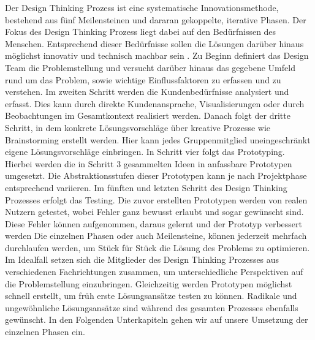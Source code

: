 Der Design Thinking Prozess ist eine systematische Innovationsmethode, bestehend aus fünf Meilensteinen und dararan gekoppelte, iterative Phasen. Der Fokus des Design Thinking Prozess liegt dabei auf den Bedürfnissen des Menschen. Entsprechend dieser Bedürfnisse sollen die Lösungen darüber hinaus möglichst innovativ und technisch machbar sein .
Zu Beginn definiert das Design Team die Problemstellung und versucht darüber hinaus das gegebene Umfeld rund um das Problem, sowie wichtige Einflussfaktoren zu erfassen und zu verstehen.
Im zweiten Schritt werden die Kundenbedürfnisse analysiert und erfasst. Dies kann durch direkte Kundenansprache, Visualisierungen oder durch Beobachtungen im Gesamtkontext realisiert werden.
Danach folgt der dritte Schritt, in dem konkrete Lösungsvorschläge über kreative Prozesse wie Brainstorming erstellt werden. Hier kann jedes Gruppenmitglied uneingeschränkt eigene Lösungsvorschläge einbringen.
In Schritt vier folgt das Prototyping. Hierbei werden die in Schritt 3 gesammelten Ideen in anfassbare Prototypen umgesetzt. Die Abstraktionsstufen dieser Prototypen kann je nach Projektphase entsprechend variieren.
Im fünften und letzten Schritt des Design Thinking Prozesses erfolgt das Testing. Die zuvor erstellten Prototypen werden von realen Nutzern getestet, wobei Fehler ganz bewusst erlaubt und sogar gewünscht sind. Diese Fehler können aufgenommen, daraus gelernt und der Prototyp verbessert werden  
Die einzelnen Phasen oder auch Meilensteine, können jederzeit mehrfach durchlaufen werden, um Stück für Stück die Lösung des Problems zu optimieren. Im Idealfall setzen sich die Mitglieder des Design Thinking Prozesses aus verschiedenen Fachrichtungen zusammen, um unterschiedliche Perspektiven auf die Problemstellung einzubringen. Gleichzeitig werden Prototypen möglichst schnell erstellt, um früh erste Lösungsansätze testen zu können. Radikale und ungewöhnliche Lösungsansätze sind während des gesamten Prozesses ebenfalls gewünscht.
In den Folgenden Unterkapiteln gehen wir auf unsere Umsetzung der einzelnen Phasen ein.